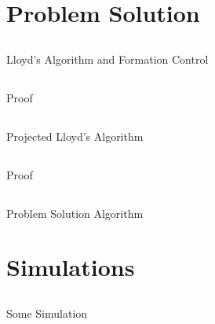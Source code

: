 \documentclass[t]{beamer}
\begin{document}

\section[Problem Solution]{Problem Solution}
\subsection[Lloyd's Algorithm and Formation Control]{}
\begin{frame}[label=sl3]{Lloyd's Algorithm and Formation Control}

\end{frame}

\subsection[Lloyd's Algorithm and Formation Control]{}
\begin{frame}[label=sl3]{Proof}

\end{frame}

\subsection[Projected Lloyd's Algorithm]{}
\begin{frame}[label=sl3]{Projected Lloyd's Algorithm}

\end{frame}

\subsection[Projected Lloyd's Algorithm]{}
\begin{frame}[label=sl3]{Proof}

\end{frame}

\subsection[Problem Solution Algorithm]{}
\begin{frame}[label=sl3]{Problem Solution Algorithm}

\end{frame}


\section[Simulations]{Simulations}
\subsection[Some Simulation]{}
\begin{frame}[label=sl3]{Some Simulation}

\end{frame}
\end{document}
